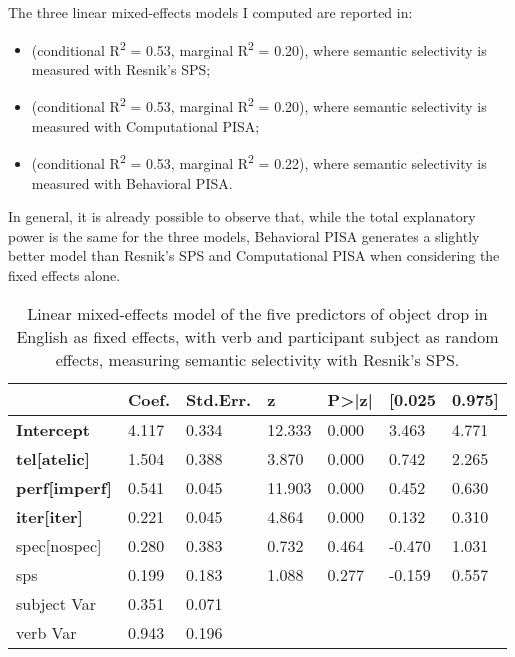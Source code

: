 The three linear mixed-effects models I computed are reported in:
\begin{itemize}
    \item {} (conditional R\textsuperscript{2} = 0.53, marginal R\textsuperscript{2} = 0.20), where semantic selectivity is measured with Resnik's SPS;
    \item {} (conditional R\textsuperscript{2} = 0.53, marginal R\textsuperscript{2} = 0.20), where semantic selectivity is measured with Computational PISA;
    \item {} (conditional R\textsuperscript{2} = 0.53, marginal R\textsuperscript{2} = 0.22), where semantic selectivity is measured with Behavioral PISA.
\end{itemize}

In general, it is already possible to observe that, while the total explanatory power is the same for the three models, Behavioral PISA generates a slightly better model than Resnik's SPS and Computational PISA when considering the fixed effects alone.

\begin{table}[htb] %
\caption{Linear mixed-effects model of the five predictors of object drop in English as fixed effects, with verb and participant subject as random effects, measuring semantic selectivity with Resnik's SPS.}
\begin{tabular}{l|llllll}
                         & Coef. & Std.Err. & z      & P\textgreater{}|z| & {[}0.025 & 0.975{]} \\
\hline                         
\textbf{Intercept}               & 4.117 & 0.334    & 12.333 & 0.000                  & 3.463    & 4.771    \\
\textbf{tel{[}atelic{]}}    & 1.504 & 0.388    & 3.870   & 0.000                  & 0.742    & 2.265    \\
\textbf{perf{[}imperf{]}} & 0.541 & 0.045    & 11.903 & 0.000                  & 0.452    & 0.630     \\
\textbf{iter{[}iter{]}}    & 0.221 & 0.045    & 4.864  & 0.000                  & 0.132    & 0.310     \\
spec{[}nospec{]}     & 0.280  & 0.383    & 0.732  & 0.464              & -0.470    & 1.031    \\
sps                      & 0.199 & 0.183    & 1.088  & 0.277              & -0.159   & 0.557    \\
subject                 Var   & 0.351    & 0.071  &                    &          &       &     \\
verb                 Var   & 0.943    & 0.196  &                    &          &         &     
\end{tabular}
\end{table}

